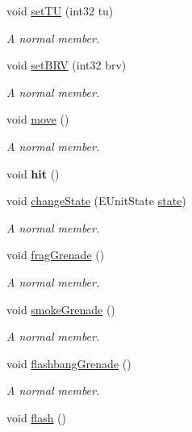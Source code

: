 \begin{DoxyCompactItemize}
void \hyperlink{class_a_unit2_d_ac7e18514213510c0077518ab1052340a}{set\+TU} (int32 tu)
\begin{DoxyCompactList}\small\item\em A normal member. \end{DoxyCompactList}\item 
void \hyperlink{class_a_unit2_d_a6a1ed9c8a68c9954bb88c58539250f87}{set\+B\+RV} (int32 brv)
\begin{DoxyCompactList}\small\item\em A normal member. \end{DoxyCompactList}\item 
void \hyperlink{class_a_unit2_d_a8567eec6dc49533041735e125cace6e2}{move} ()
\begin{DoxyCompactList}\small\item\em A normal member. \end{DoxyCompactList}\item 
\hypertarget{class_a_unit2_d_a00227806480536a3b6f34eed9529e173}{}\label{class_a_unit2_d_a00227806480536a3b6f34eed9529e173} 
void {\bfseries hit} ()
\item 
void \hyperlink{class_a_unit2_d_a3a66da88663696462e73a5933c0d1032}{change\+State} (E\+Unit\+State \hyperlink{class_a_unit2_d_a33b3a09dc710021ce343630e828ebb1b}{state})
\begin{DoxyCompactList}\small\item\em A normal member. \end{DoxyCompactList}\item 
void \hyperlink{class_a_unit2_d_a6631cea7c02eb12361dc14439b942f70}{frag\+Grenade} ()
\begin{DoxyCompactList}\small\item\em A normal member. \end{DoxyCompactList}\item 
void \hyperlink{class_a_unit2_d_ae12beff66c2558df2ca19ae222900988}{smoke\+Grenade} ()
\begin{DoxyCompactList}\small\item\em A normal member. \end{DoxyCompactList}\item 
void \hyperlink{class_a_unit2_d_af14e1b38ce6238bb9343eca175c15f29}{flashbang\+Grenade} ()
\begin{DoxyCompactList}\small\item\em A normal member. \end{DoxyCompactList}\item 
void \hyperlink{class_a_unit2_d_a9ba62a68377a9584eee863d76079943b}{flash} ()

\end{DoxyCompactItemize}
